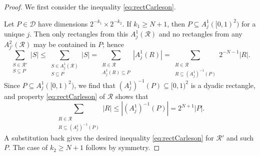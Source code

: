 \documentclass[11pt, reqno]{amsart}
\theoremstyle{definition}
\theoremstyle{remark}
\numberwithin{equation}{section}
\newcommand{\abs}[1]{|#1|}
\begin{document}
\begin{proof}
We first consider the inequality \eqref{eq:rectCarleson}.

Let $P\in\mathscr D$ have dimensions $2^{-k_1}\times 2^{-k_2}$. If $k_1\geq N+1$, then $P\subseteq A_j^1([0,1)^2)$ for a unique $j$. Then only rectangles from this $A_j^1(\mathscr R)$ and no rectangles from any $A_{j'}^2(\mathscr R)$ may be contained in $P$; hence
\begin{equation*}
  \sum_{\substack{ S\in\mathscr R' \\ S\subseteq P}}\abs{S}
  \leq\sum_{\substack{ S\in A_j^1(\mathscr R)\\ S\subseteq P}}\abs{S}
  =\sum_{\substack{ R\in \mathscr R \\ A_j^1(R)\subseteq P}}\abs{A_j^1(R)}
  =\sum_{\substack{ R\in \mathscr R \\ R \subseteq (A_j^1)^{-1}(P)}} 2^{-N-1}\abs{R}.
\end{equation*}
Since $P\subseteq A_j^1([0,1)^2)$, we find that $(A_j^1)^{-1}(P)\subseteq [0,1)^2$ is a dyadic rectangle, and property \eqref{eq:rectCarleson} of $\mathscr R$ shows that
\begin{equation*}
  \sum_{\substack{ R\in \mathscr R \\ R \subseteq (A_j^1)^{-1}(P)}} \abs{R}
  \leq \abs{(A_j^1)^{-1}(P)}=2^{N+1}\abs{P}.
\end{equation*}
A substitution back gives the desired inequality \eqref{eq:rectCarleson} for $\mathscr R'$ and such $P$. The case of $k_2\geq N+1$ follows by symmetry.


\end{proof}
\end{document}
